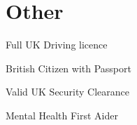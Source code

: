 \sectionsep
\section{Other}
\vspace{-\topsep} %
\begin{flushleft}
    \begin{multicols}{3}
        \begin{tightemize}
            \item Full UK Driving licence
            \item British Citizen with Passport
            \item Valid UK Security Clearance
            \item Mental Health First Aider
        \end{tightemize}
    \end{multicols}
\end{flushleft}
\sectionsep